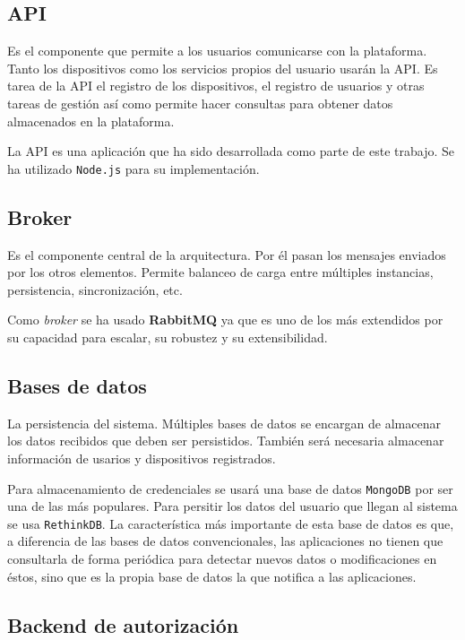 \subsection{API}

Es el componente que permite a los usuarios comunicarse con la plataforma.
Tanto los dispositivos como los servicios propios del usuario usarán la API. Es
tarea de la API el registro de los dispositivos, el registro de usuarios y otras
tareas de gestión así como permite hacer consultas para obtener datos
almacenados en la plataforma.

La API es una aplicación que ha sido desarrollada como parte de este trabajo.
Se ha utilizado \texttt{Node.js} para su implementación.

\subsection{Broker}

Es el componente central de la arquitectura. Por él pasan
los mensajes enviados por los otros elementos. Permite balanceo de carga entre
múltiples instancias, persistencia, sincronización, etc.

Como \emph{broker} se ha usado \textbf{RabbitMQ} ya que es uno de los más
extendidos por su capacidad para escalar, su robustez y su extensibilidad.

\subsection{Bases de datos}

La persistencia del sistema. Múltiples bases de datos se
encargan de almacenar los datos recibidos que deben ser persistidos. También
será necesaria almacenar información de usarios y dispositivos registrados.

Para almacenamiento de credenciales se usará una base de datos \texttt{MongoDB}
por ser una de las más populares. Para persitir los datos del usuario que llegan
al sistema se usa \texttt{RethinkDB}. La característica más importante de esta
base de datos es que, a diferencia de las bases de datos convencionales, las
aplicaciones no tienen que consultarla de forma periódica para detectar nuevos
datos o modificaciones en éstos, sino que es la propia base de datos la que
notifica a las aplicaciones.

\subsection{Backend de autorización}

